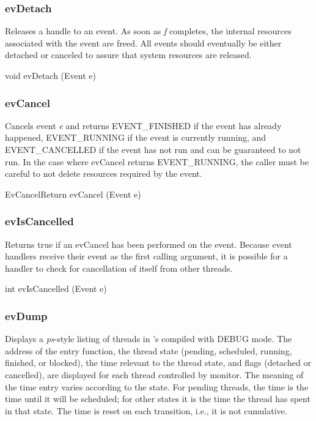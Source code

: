 \subsubsection{evDetach}

Releases a handle to an event. As soon as {\em f} completes, the
internal resources associated with the event are freed.  All events
should eventually be either detached or canceled
to assure that system resources are released.
\medskip

{\sem void}  {\bold evDetach} ({\sem Event} {\caps e})
\medskip

\subsubsection{evCancel}

Cancels event {\em e} and returns EVENT\_FINISHED if the event has
already happened, EVENT\_RUNNING if the event is currently running, and
EVENT\_CANCELLED if the event has not run and can be guaranteed to not
run. In the case where {\bold evCancel} returns EVENT\_RUNNING, the
caller must be careful to not delete resources required by the event.
\medskip

{\sem EvCancelReturn} {\bold evCancel} ({\sem Event} {\caps e})


\subsubsection{evIsCancelled}

Returns true if an {\bold evCancel} has been performed on the event. 
Because event handlers receive their event as the first calling
argument, it is possible for a handler to check for cancellation
of itself from other threads.

\medskip

{\sem int} {\bold evIsCancelled} ({\sem Event} {\caps e})


\subsubsection{evDump}

Displays a {\em ps}-style listing of \xk{} threads in \xk{}'s compiled
with DEBUG mode.  The address of the entry function, the thread state
(pending, scheduled, running, finished, or blocked), the
time relevant to the thread state, and flags (detached or cancelled), are
displayed for each thread controlled by \xk{} monitor.  The meaning
of the time entry varies according to the state.  For pending threads,
the time is the time until it will be scheduled; for other states
it is the time the thread has spent in that state.  The time is reset
on each transition, i.e., it is not cumulative.

